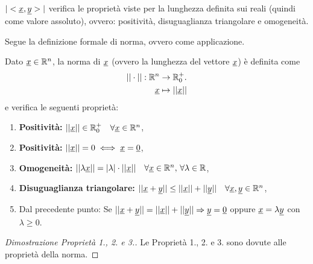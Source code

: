 $|<\uline x,\uline y>|$ verifica le proprietà viste per la lunghezza definita sui reali (quindi come valore assoluto), ovvero: positività, disuguaglianza triangolare e omogeneità.

Segue la definizione formale di norma, ovvero come applicazione.
\begin{definition}[Norma]\label{def:norma}
    Dato $\uline x\in\mathbb R^n$, la norma di $\uline x$ (ovvero la lunghezza del vettore $\uline x$) è definita come
    \begin{equation}
        \begin{aligned}[t]
            ||\cdot||:\mathbb R^n &\rightarrow\mathbb R^+_0.\\
            \uline x &\mapsto ||\uline x||
        \end{aligned}
    \end{equation}
    e verifica le seguenti proprietà:
    \begin{enumerate}
        \item \textbf{Positività:} $||\uline x||\in\mathbb R^+_0\quad \forall\uline x\in\mathbb R^n$,
        \item \textbf{Positività:} $||\uline x||=0\iff\uline x=\uline 0$,
        \item \textbf{Omogeneità:} $||\lambda \uline x||=|\lambda|\cdot||\uline x||\quad\forall\uline x\in\mathbb R^n,\,\forall\lambda\in\mathbb R$,
        \item \textbf{Disuguaglianza triangolare:} $||\uline x+\uline y||\leq ||\uline x||+||\uline y||\quad \forall\uline x,\uline y\in\mathbb R^n$,
        \item Dal precedente punto: Se $||\uline x+\uline y||=||\uline x||+||\uline y||\Rightarrow\uline y=\uline 0$ oppure $\uline x=\lambda\uline y$ con $\lambda\geq 0$.
    \end{enumerate}
\end{definition}
\begin{proof}[Dimostrazione Proprietà 1., 2. e 3.]
    Le Proprietà 1., 2. e 3. sono dovute alle proprietà della norma.
\end{proof}

